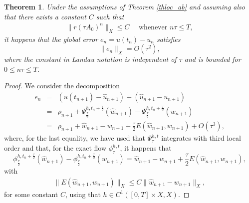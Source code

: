 \documentclass[a4paper,12pt]{article}
\newtheorem{theorem}{Theorem}
\begin{document}
\begin{theorem} Under the assumptions of Theorem \ref{thloc_ab} and assuming also that there exists a constant $C$ such that
\begin{eqnarray}
\|r(\tau A_0)^n \|_{X} \le C \quad \mbox{ whenever }n \tau \le T,
\label{stab}
\end{eqnarray}
it happens that the global error $e_n=u(t_n)-u_n$ satisfies
$$\|e_n\|_X=O(\tau^2),$$
where the constant in Landau notation is independent of $\tau$ and is bounded for $0\le n \tau \le T$.
\end{theorem}

\begin{proof}
We consider the decomposition
\begin{eqnarray}
e_n&=&(u(t_{n+1})-\hat{u}_{n+1})+(\hat{u}_{n+1}-u_{n+1}) \nonumber \\
&=& \rho_{n+1}+\Psi_{\frac{\tau}{2}}^{h,t_n+\frac{\tau}{2}}(\hat{w}_{n+1})-\Psi_{\frac{\tau}{2}}^{h,t_n+\frac{\tau}{2}}(w_{n+1}) \nonumber \\
&=& \rho_{n+1}+\hat{w}_{n+1}-w_{n+1}+\frac{\tau}{2}E(\hat{w}_{n+1},w_{n+1})+O(\tau^3), \label{decomp}
\end{eqnarray}
where, for the last equality, we have used that $\Psi_{\tau}^{h,t}$ integrates with third local order and that, for the exact flow $\phi_{\tau}^{h,t}$, it happens that
$$
\phi_{\frac{\tau}{2}}^{h,t_n+\frac{\tau}{2}}(\hat{w}_{n+1})-\phi_{\frac{\tau}{2}}^{h,t_n+\frac{\tau}{2}}(w_{n+1})=\hat{w}_{n+1}-w_{n+1}+\frac{\tau}{2}E(\hat{w}_{n+1},w_{n+1}),$$
with
\begin{eqnarray}
\|E(\hat{w}_{n+1},w_{n+1})\|_X \le C \|\hat{w}_{n+1}-w_{n+1}\|_X,
\end{eqnarray}
for some constant $C$, using that $h\in C^1([0,T]\times X, X)$.


\end{proof}
\end{document}
